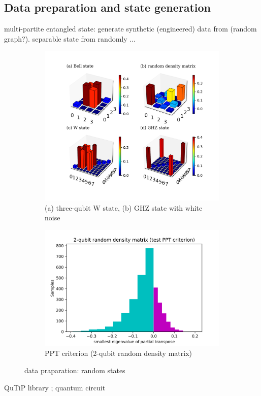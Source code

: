 \documentclass[
aps,
pra,
floatfix,
]{revtex4-2}
\theoremstyle{plain}
\theoremstyle{definition}
\begin{document}
\subsection{Data preparation and state generation}
multi-partite entangled state: generate synthetic (engineered) data from (random graph?).
separable state from randomly ...
\begin{figure}[!ht]
	\centering
	\begin{subfigure}{0.42\textwidth}
	\centering
		\includegraphics[width=.9\linewidth]{./Code/dataset_sample.png}
		\caption{(a) three-qubit W state, (b) GHZ state with white noise}
	\end{subfigure}
	\begin{subfigure}{0.55\textwidth}
	\centering
		\includegraphics[width=.9\linewidth]{./Code/two_qubit_PPT_hist.png}
		\caption{PPT criterion (2-qubit random density matrix)}
	\end{subfigure}
	\caption{data praparation: random states}
\end{figure}
QuTiP library \cite{johanssonQuTiPPythonFramework2013}; quantum circuit \cite{liPulselevelNoisyQuantum2022}
\end{document}
